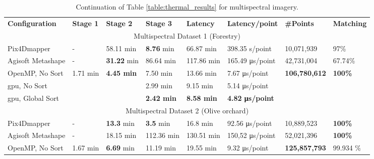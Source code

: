 \renewcommand{\arraystretch}{1.3}
\begin{table}
    \centering
    \footnotesize
    \caption{Continuation of Table \ref{table:thermal_results} for multispectral imagery.\\ }
    \label{table:multispectral_results}
    \begin{tabular}{l@{\hskip 0.06in}|lll|l|l|l|l}
    \toprule
    \textbf{Configuration} & \textbf{Stage 1} & \textbf{Stage 2} & \textbf{Stage 3} & \textbf{Latency} & \textbf{Latency/point} & \textbf{\#Points} & \textbf{Matching}\\
    \cmidrule{1-8}
    \multicolumn{8}{c}{Multispectral Dataset 1 (Forestry)}\\
    \cmidrule{1-8}
    Pix4Dmapper & - & 58.11 \si{\minute} & \textbf{8.76} \si{\minute} & 66.87 \si{\minute} & 398.35 \si{\second}/point & 10,071,939 & 97\%\\
    Agisoft Metashape & - & \textbf{31.22} \si{\minute} & 86.64 \si{\minute} & 117.86 \si{\minute} & 165.49 \si{\micro\second}/point & 42,731,004 & 67.74\%\\
    \cmidrule{1-8}
    OpenMP, No Sort & \multirow{\numExperiments}{*}{1.71 \si{\minute}} & \multirow{\numExperiments}{*}{\textbf{4.45 \si{\minute}}} & 7.50 \si{\minute} & 13.66 \si{\minute} & 7.67 \si{\micro\second}/point & \multirow{\numExperiments}{*}{\textbf{106,780,612}} & \multirow{\numExperiments}{*}{\textbf{100\%}}\\
    \acrshort{gpu}, No Sort & & & 2.99 \si{\minute} & 9.15 \si{\minute} & 5.14 \si{\micro\second}/point & &\\
    \acrshort{gpu}, Global Sort & & & \textbf{2.42 \si{\minute}} & \textbf{8.58 \si{\minute}} & \textbf{4.82 \si{\micro\second}/point} & &\\
    \bottomrule
    \toprule
    \multicolumn{8}{c}{Multispectral Dataset 2 (Olive orchard)}\\
    \cmidrule{1-8}
    Pix4Dmapper & - & \textbf{13.3} \si{\minute} & \textbf{3.5} \si{\minute} & 16.8 \si{\minute} & 92.56 \si{\micro\second}/point & 10,889,523 & \textbf{100\%}\\
    Agisoft Metashape & - & 18.15 \si{\minute} & 112.36 \si{\minute} & 130.51 \si{\minute} & 150,52 \si{\micro\second}/point & 52,021,396 & \textbf{100\%}\\
    \cmidrule{1-8}
    OpenMP, No Sort & \multirow{\numExperiments}{*}{1.67 \si{\minute}} & \multirow{\numExperiments}{*}{\textbf{6.69} \si{\minute}} & 11.19 \si{\minute} & 19.55 \si{\minute} & 9.32 \si{\micro\second}/point & \multirow{\numExperiments}{*}{\textbf{125,857,793}} & \multirow{\numExperiments}{*}{99.934 \%}\\

\end{tabular}
\end{table}
